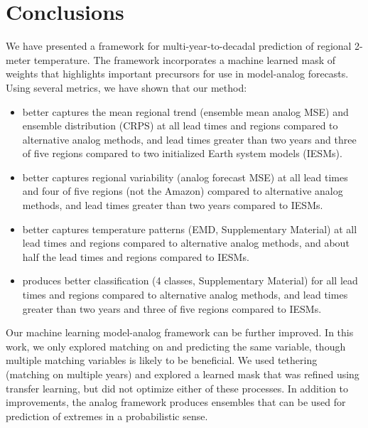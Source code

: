\section{Conclusions}\label{sec:conclusions}

We have presented a framework for multi-year-to-decadal prediction of regional 2-meter temperature.
The framework incorporates a machine learned mask of weights that highlights important precursors for use in model-analog forecasts.
Using several metrics, we have shown that our method:
\begin{itemize}
    \item better captures the mean regional trend (ensemble mean analog MSE) and ensemble distribution (CRPS) at all lead times and regions compared to alternative analog methods, and lead times greater than two years and three of five regions compared to two initialized Earth system models (IESMs).
    \item better captures regional variability (analog forecast MSE) at all lead times and four of five regions (not the Amazon) compared to alternative analog methods, and lead times greater than two years compared to IESMs.
    \item better captures temperature patterns (EMD, Supplementary Material) at all lead times and regions compared to alternative analog methods, and about half the lead times and regions compared to IESMs.
    \item produces better classification (4 classes, Supplementary Material) for all lead times and regions compared to alternative analog methods, and lead times greater than two years and three of five regions compared to IESMs.
\end{itemize}

Our machine learning model-analog framework can be further improved.
In this work, we only explored matching on and predicting the same variable, though multiple matching variables is likely to be beneficial.
We used tethering (matching on multiple years) and explored a learned mask that was refined using transfer learning, but did not optimize either of these processes.
In addition to improvements, the analog framework produces ensembles that can be used for prediction of extremes in a probabilistic sense.

